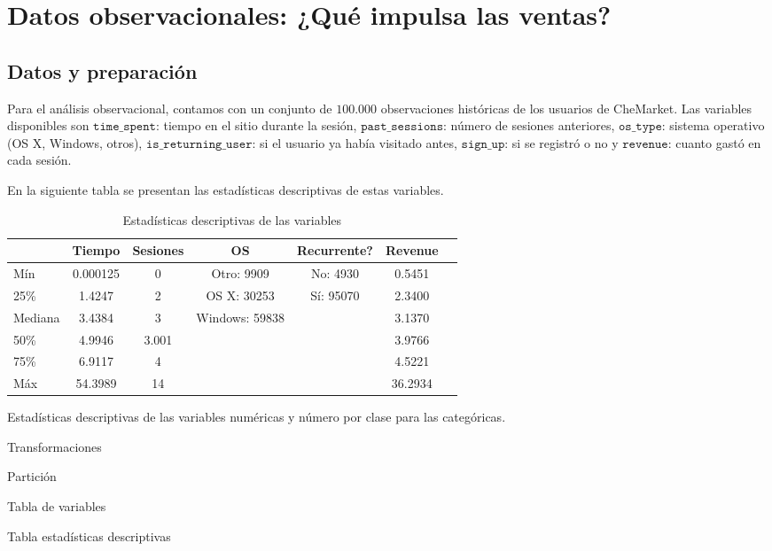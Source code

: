 \documentclass[conference]{IEEEtran}
\begin{document}
\section{Datos observacionales: ¿Qué impulsa las ventas?}

\subsection{Datos y preparación}

Para el análisis observacional, contamos con un conjunto de $100.000$ observaciones históricas de los usuarios de CheMarket. Las variables disponibles son $\texttt{time\_spent}$: tiempo en el sitio durante la sesión, $\texttt{past\_sessions}$: número de sesiones anteriores, $\texttt{os\_type}$: sistema operativo (OS X, Windows, otros), $\texttt{is\_returning\_user}$: si el usuario ya había visitado antes, $\texttt{sign\_up}$: si se registró o no y $\texttt{revenue}$: cuanto gastó en cada sesión.

En la siguiente tabla se presentan las estadísticas descriptivas de estas variables.


\begin{table}[H]
\centering
\caption{Estadísticas descriptivas de las variables}
\begin{tabular}{|l|c|c|c|c|c|c|}
\hline
 & \textbf{Tiempo} & \textbf{Sesiones} &  \textbf{OS} & \textbf{Recurrente?} & \textbf{Revenue} \\
\hline
Mín & 0.000125 & 0  & Otro: 9909 & No: 4930 & 0.5451 \\
25\% & 1.4247 & 2  & OS X: 30253 & Sí: 95070 & 2.3400 \\
Mediana & 3.4384 & 3  & Windows: 59838 & & 3.1370 \\
50\% & 4.9946 & 3.001  & & & 3.9766 \\
75\%  & 6.9117 & 4  & & & 4.5221 \\
Máx & 54.3989 & 14  & & & 36.2934 \\
\hline
\end{tabular}

\hfill \break
Estadísticas descriptivas de las variables numéricas y número por clase para las categóricas.

\end{table}

Transformaciones

Partición

Tabla de variables 

Tabla estadísticas descriptivas
\end{document}
